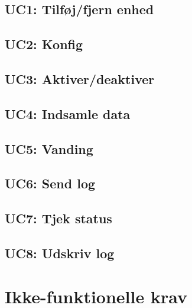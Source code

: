 %


\subsection{UC1: Tilføj/fjern enhed}



\subsection{UC2: Konfig}



\subsection{UC3: Aktiver/deaktiver}



\subsection{UC4: Indsamle data}



\subsection{UC5: Vanding}



\subsection{UC6: Send log}



\subsection{UC7: Tjek status}



\subsection{UC8: Udskriv log}



\section{Ikke-funktionelle krav}

